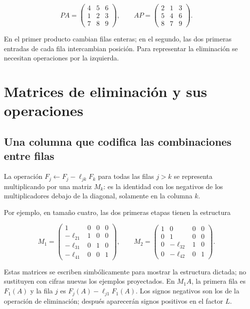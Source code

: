 \documentclass[12pt,a4paper]{article}
\begin{document}
\[
PA=\begin{pmatrix}4&5&6\\1&2&3\\7&8&9\end{pmatrix},\qquad
AP=\begin{pmatrix}2&1&3\\5&4&6\\8&7&9\end{pmatrix}.
\]

En el primer producto cambian filas enteras; en el segundo, las dos primeras entradas de cada fila intercambian posición. Para representar la eliminación se necesitan operaciones por la izquierda.

\section{Matrices de eliminación y sus operaciones}

\subsection{Una columna que codifica las combinaciones entre filas}

La operación $F_j\leftarrow F_j-\ell_{jk}F_k$ para todas las filas $j>k$ se representa multiplicando por una matriz $M_k$: es la identidad con los negativos de los multiplicadores debajo de la diagonal, solamente en la columna $k$.

Por ejemplo, en tamaño cuatro, las dos primeras etapas tienen la estructura

\[
M_1=\begin{pmatrix}
1&0&0&0\\-\ell_{21}&1&0&0\\-\ell_{31}&0&1&0\\-\ell_{41}&0&0&1
\end{pmatrix},\qquad
M_2=\begin{pmatrix}
1&0&0&0\\0&1&0&0\\0&-\ell_{32}&1&0\\0&-\ell_{42}&0&1
\end{pmatrix}.
\]


Estas matrices se escriben simbólicamente para mostrar la estructura dictada; no sustituyen con cifras nuevas los ejemplos proyectados. En $M_1A$, la primera fila es $F_1(A)$ y la fila $j$ es $F_j(A)-\ell_{j1}F_1(A)$. Los signos negativos son los de la operación de eliminación; después aparecerán signos positivos en el factor $L$.
\end{document}
